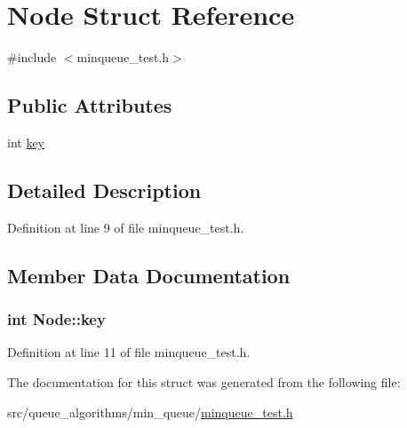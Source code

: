 \hypertarget{struct_node}{}\section{Node Struct Reference}
\label{struct_node}


{\ttfamily \#include $<$minqueue\+\_\+test.\+h$>$}

\subsection*{Public Attributes}
\begin{DoxyCompactItemize}
\item 
int \hyperlink{struct_node_a3020957813f200a9da836428aad2d8d7}{key}
\end{DoxyCompactItemize}


\subsection{Detailed Description}


Definition at line 9 of file minqueue\+\_\+test.\+h.



\subsection{Member Data Documentation}
\hypertarget{struct_node_a3020957813f200a9da836428aad2d8d7}{}
\subsubsection[{key}]{\setlength{\rightskip}{0pt plus 5cm}int Node\+::key}\label{struct_node_a3020957813f200a9da836428aad2d8d7}


Definition at line 11 of file minqueue\+\_\+test.\+h.



The documentation for this struct was generated from the following file\+:\begin{DoxyCompactItemize}
\item 
src/queue\+\_\+algorithms/min\+\_\+queue/\hyperlink{minqueue__test_8h}{minqueue\+\_\+test.\+h}\end{DoxyCompactItemize}

